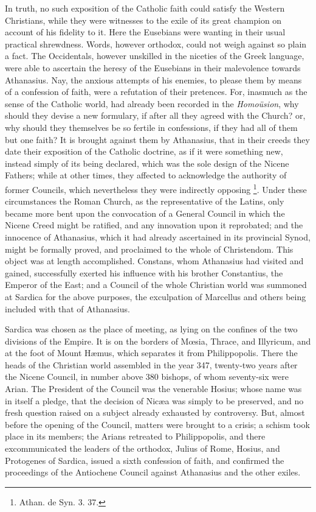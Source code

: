 In truth, no such exposition of the Catholic faith could satisfy
the Western Christians, while they were witnesses to the exile of its
great champion on account of his fidelity to it. Here the Eusebians
were wanting in their usual practical shrewdness. Words, however
orthodox, could not weigh against so plain a fact. The Occidentals,
however unskilled in the niceties of the Greek language, were able to
ascertain the heresy of the Eusebians in their malevolence towards
Athanasius. Nay, the anxious attempts of his enemies, to please them
by means of a confession of faith, were a refutation of their
pretences. For, inasmuch as the sense of the Catholic world, had
already been recorded in the \emph{Homoüsion}, why should they devise
a new formulary, if after all they agreed with the Church? or, why
should they themselves be so fertile in confessions, if they had all
of them but one faith? It is brought against them by Athanasius, that
in their creeds they date their exposition of the Catholic doctrine,
as if it were something new, instead simply of its being declared,
which was the sole design of the Nicene Fathers; while at other times,
they affected to acknowledge the authority of former Councils, which
nevertheless they were indirectly opposing \footnote{Athan. de Syn. 3. 37.}. Under these circumstances the Roman Church, as the
representative of the Latins, only became more bent upon the
convocation of a General Council in which the Nicene Creed might be
ratified, and any innovation upon it reprobated; and the innocence of
Athanasius, which it had already ascertained in its provincial Synod,
might be formally proved, and proclaimed to the whole of Christendom.
This object was at length accomplished. Constans, whom
Athanasius had visited and gained, successfully exerted his influence
with his brother Constantius, the Emperor of the East; and a Council
of the whole Christian world was summoned at Sardica for the above
purposes, the exculpation of Marcellus and others being included with
that of Athanasius.

Sardica was chosen as the place of meeting, as lying on the
confines of the two divisions of the Empire. It is on the borders of Mœsia,
Thrace, and Illyricum, and at the foot of Mount Hæmus, which
separates it from Philippopolis. There the heads of the Christian
world assembled in the year 347, twenty-two years after the Nicene
Council, in number above 380 bishops, of whom seventy-six were Arian.
The President of the Council was the venerable Hosius; whose name was
in itself a pledge, that the decision of Nicæa was simply to be
preserved, and no fresh question raised on a subject already exhausted
by controversy. But, almost before the opening of the Council, matters
were brought to a crisis; a schism took place in its members; the
Arians retreated to Philippopolis, and there excommunicated the
leaders of the orthodox, Julius of Rome, Hosius, and Protogenes of
Sardica, issued a sixth confession of faith, and confirmed the
proceedings of the Antiochene Council against Athanasius and the other
exiles.


